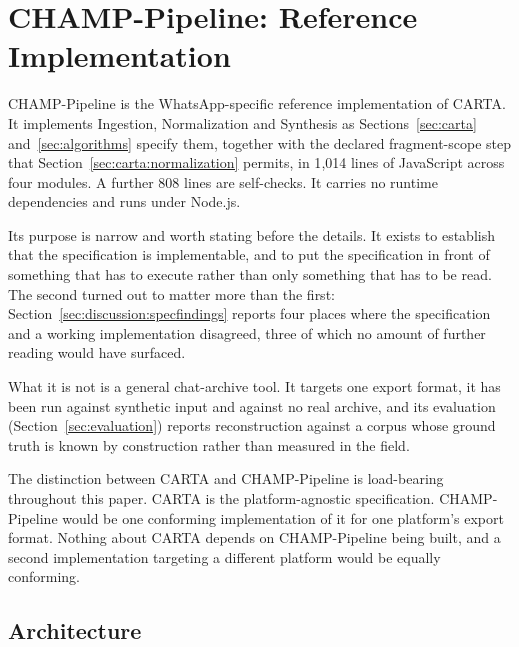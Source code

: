 
\section{CHAMP-Pipeline: Reference Implementation}
\label{sec:implementation}

CHAMP-Pipeline is the WhatsApp-specific reference implementation of CARTA. It
implements Ingestion, Normalization and Synthesis as
Sections~\ref{sec:carta} and~\ref{sec:algorithms} specify them, together with the
declared fragment-scope step that
Section~\ref{sec:carta:normalization} permits, in 1{,}014 lines of JavaScript
across four modules. A further 808 lines are self-checks. It carries no runtime
dependencies and runs under Node.js.

Its purpose is narrow and worth stating before the details. It exists to
establish that the specification is implementable, and to put the specification
in front of something that has to execute rather than only something that has to
be read. The second turned out to matter more than the first:
Section~\ref{sec:discussion:specfindings} reports four places where the
specification and a working implementation disagreed, three of which no amount of
further reading would have surfaced.

What it is not is a general chat-archive tool. It targets one export format, it
has been run against synthetic input and against no real archive, and its
evaluation (Section~\ref{sec:evaluation}) reports reconstruction against a corpus
whose ground truth is known by construction rather than measured in the field.

The distinction between CARTA and CHAMP-Pipeline is load-bearing throughout this
paper. CARTA is the platform-agnostic specification. CHAMP-Pipeline would be one
conforming implementation of it for one platform's export format. Nothing about
CARTA depends on CHAMP-Pipeline being built, and a second implementation targeting
a different platform would be equally conforming.

\subsection{Architecture}
\label{sec:implementation:architecture}

